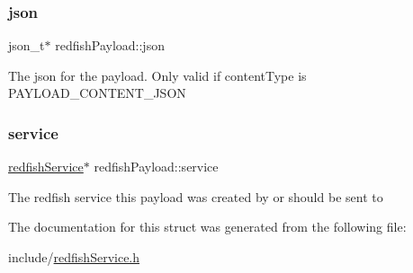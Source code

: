 \subsubsection{\texorpdfstring{json}{json}}
{\footnotesize\ttfamily json\+\_\+t$\ast$ redfish\+Payload\+::json}

The json for the payload. Only valid if content\+Type is P\+A\+Y\+L\+O\+A\+D\+\_\+\+C\+O\+N\+T\+E\+N\+T\+\_\+\+J\+S\+ON \mbox{\label{structredfishPayload_a0b04265e9d24b01897b3ddf031fa8fb7}} 
\subsubsection{\texorpdfstring{service}{service}}
{\footnotesize\ttfamily \hyperlink{redfishService_8h_a4c9115c0f0a21de971c0dfae06f26372}{redfish\+Service}$\ast$ redfish\+Payload\+::service}

The redfish service this payload was created by or should be sent to 

The documentation for this struct was generated from the following file\+:\begin{DoxyCompactItemize}
\item 
include/\hyperlink{redfishService_8h}{redfish\+Service.\+h}\end{DoxyCompactItemize}
